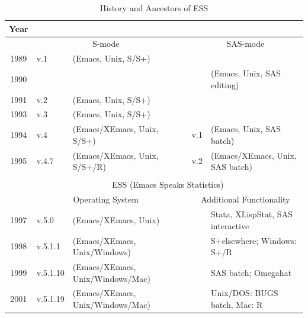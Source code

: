 \documentclass{article}
\begin{document}
\begin{table}[tbp]
  \centering
  \begin{tabular}{c ll c ll}
\hline
    Year  \\ 
\hline
         & \multicolumn{2}{c}{S-mode}       && \multicolumn{2}{c}{SAS-mode} \\ 
\cline{2-3} \cline{5-6}
    1989 & v.1 & (Emacs, Unix, S/S+)        &&  \\
    1990 &     &                            &&     & (Emacs, Unix, SAS editing) \\
    1991 & v.2 & (Emacs, Unix, S/S+)        && \\
    1993 & v.3 & (Emacs, Unix, S/S+)        && \\
    1994 & v.4 & (Emacs/XEmacs, Unix, S/S+) && v.1  & (Emacs, Unix, SAS batch) \\
    1995 & v.4.7 & (Emacs/XEmacs, Unix, S/S+/R) && v.2 & (Emacs/XEmacs, Unix, SAS batch) \\
    \cline{2-6}\\[-3.5ex]
    \cline{2-6}
         & \multicolumn{5}{c}{ESS (Emacs Speaks Statistics)} \\
    \cline{2-6} 
         &\multicolumn{2}{c}{Operating System} &&\multicolumn{2}{c}{Additional Functionality}\\
\cline{2-3} \cline{5-6}
    1997 & v.5.0 & (Emacs/XEmacs, Unix)         &&&  Stata, XLispStat, SAS interactive \\
    1998 & v.5.1.1 & (Emacs/XEmacs, Unix/Windows) &&&  S+elsewhere; Windows: S+/R\\
    1999 & v.5.1.10 & (Emacs/XEmacs, Unix/Windows/Mac) &&& SAS batch; Omegahat \\
    2001 & v.5.1.19 & (Emacs/XEmacs, Unix/Windows/Mac) &&& Unix/DOS: BUGS batch, Mac: R \\
\hline
  \end{tabular}
  \caption{History and Ancestors of ESS}
  \label{tab:timeline}
\end{table}
\end{document}
